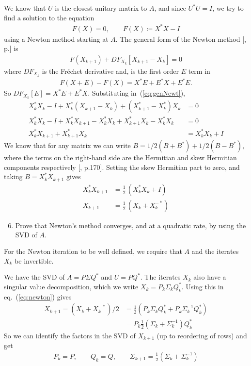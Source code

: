 \documentclass[10pt, A4paper]{article}
\begin{document}
We know that $U$ is the closest unitary matrix to $A$, and since 
$U^*U=I$, we try to find a solution to the equation
\begin{align}
	F(X) = 0,\qquad F(X)\coloneqq X^*X - I
\end{align}
using a Newton method starting at $A$.
The general form of the Newton method [\cite{Kell2003}, p.] is
\begin{align}
	F(X_{k+1}) + DF_{X_k} \left[X_{k+1} - X_k\right] = 0
	\label{eq:genNewt}
\end{align}
where $DF_{X_k}$ is the Fréchet derivative and, is the first order $E$ 
term in
\begin{align}
	F(X+E) - F(X) = X^*E + E^*X + E^*E.
\end{align}
So $DF_{X_k}[E] = X^*E + E^*X$. Substituting in~(\ref{eq:genNewt}),
\begin{align}
	X_k^*X_k - I + X_k^* \left( X_{k+1} - X_k \right) + 
		\left( X_{k+1}^* - X_k^* \right)X_k &= 0 \\
	X_k^*X_k - I + X_k^* X_{k+1} - X_k^* X_k + 
		X_{k+1}^* X_k - X_k^*  X_k &= 0 \\
	X_k^* X_{k+1} + X_{k+1}^*X_k &= X_k^* X_k + I
\end{align}
We know that for any matrix we can write $B = 1/2(B + B^*) + 
1/2(B-B^*)$, where the terms on the right-hand side are the Hermitian 
and skew Hermitian components respectively [\citealp{hojo1985}, p.170].
Setting the skew Hermitian part to zero, and taking $B = X_k^*X_{k+1}$ 
gives
\begin{align}
	X_k^*X_{k+1} &= \frac{1}{2} \, (X_k^*X_k + I) \\
	X_{k+1} &= \frac{1}{2} \, (X_k + X_k^{-*})
	\label{eq:newton}
\end{align}





\vspace{0.2cm}
\begin{enumerate}
	\setcounter{enumi}{5}
	\item Prove that Newton's method converges, and at a quadratic
	rate, by using the SVD of $A$.
\end{enumerate}

For the Newton iteration to be well defined, we require that $A$ and 
the iterates $X_k$ be invertible.

We have the SVD of $A = P\Sigma Q^*$ and $U = PQ^*$.
The iterates $X_k$ also have a singular value decomposition, which we 
write $X_k=P_k \Sigma_k Q_k^*$. Using this in eq.~(\ref{eq:newton}) 
gives
\begin{align}
	X_{k+1} = (X_k + X_k^{-*})/2 &= \frac{1}{2} (P_k \Sigma_k Q_k^* + 
	P_k \Sigma_k^{-1} Q_k^*)\\
	&= P_k \frac{1}{2}(\Sigma_k + \Sigma_k^{-1}) Q_k^*
\end{align}
So we can identify the factors in the SVD of $X_{k+1}$ (up to 
reordering of rows) and get 
\begin{align}
	P_k = P, \qquad Q_k = Q, \qquad \Sigma_{k+1} = \frac{1}{2}
	\left(\Sigma_k + \Sigma_k^{-1} \right)
\end{align}
\end{document}
